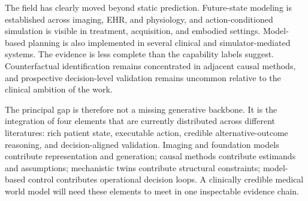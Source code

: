 The field has clearly moved beyond static prediction. Future-state modeling is established across imaging, EHR, and physiology, and action-conditioned simulation is visible in treatment, acquisition, and embodied settings. Model-based planning is also implemented in several clinical and simulator-mediated systems. The evidence is less complete than the capability labels suggest. Counterfactual identification remains concentrated in adjacent causal methods, and prospective decision-level validation remains uncommon relative to the clinical ambition of the work.

The principal gap is therefore not a missing generative backbone. It is the integration of four elements that are currently distributed across different literatures: rich patient state, executable action, credible alternative-outcome reasoning, and decision-aligned validation. Imaging and foundation models contribute representation and generation; causal methods contribute estimands and assumptions; mechanistic twins contribute structural constraints; model-based control contributes operational decision loops. A clinically credible medical world model will need these elements to meet in one inspectable evidence chain.


